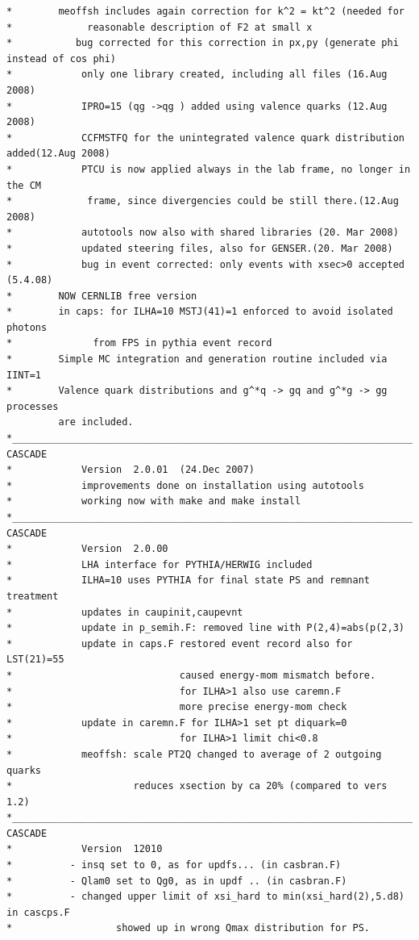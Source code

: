 \documentclass[11pt]{article} \usepackage{mystyle-new}
\begin{document}
\begin{tiny}
\begin{verbatim}
*		 meoffsh includes again correction for k^2 = kt^2 (needed for
*             reasonable description of F2 at small x
*	        bug corrected for this correction in px,py (generate phi instead of cos phi)
*            only one library created, including all files (16.Aug 2008)
*            IPRO=15 (qg ->qg ) added using valence quarks (12.Aug 2008)
*            CCFMSTFQ for the unintegrated valence quark distribution added(12.Aug 2008)
*            PTCU is now applied always in the lab frame, no longer in the CM
*             frame, since divergencies could be still there.(12.Aug 2008)
*            autotools now also with shared libraries (20. Mar 2008)
*            updated steering files, also for GENSER.(20. Mar 2008)
*            bug in event corrected: only events with xsec>0 accepted (5.4.08)
*		 NOW CERNLIB free version
* 		 in caps: for ILHA=10 MSTJ(41)=1 enforced to avoid isolated photons
*              from FPS in pythia event record
*		 Simple MC integration and generation routine included via IINT=1
*		 Valence quark distributions and g^*q -> gq and g^*g -> gg processes
		 are included.
*________________________________________________________________________
CASCADE 
*            Version  2.0.01  (24.Dec 2007)
*            improvements done on installation using autotools
*            working now with make and make install
*________________________________________________________________________
CASCADE 
*            Version  2.0.00 
*            LHA interface for PYTHIA/HERWIG included
*            ILHA=10 uses PYTHIA for final state PS and remnant treatment
*            updates in caupinit,caupevnt
*            update in p_semih.F: removed line with P(2,4)=abs(p(2,3)
*            update in caps.F restored event record also for LST(21)=55
*                             caused energy-mom mismatch before.
*                             for ILHA>1 also use caremn.F
*                             more precise energy-mom check
*            update in caremn.F for ILHA>1 set pt diquark=0
*                             for ILHA>1 limit chi<0.8
*            meoffsh: scale PT2Q changed to average of 2 outgoing quarks
*                     reduces xsection by ca 20% (compared to vers 1.2)
*________________________________________________________________________
CASCADE 
*            Version  12010
*          - insq set to 0, as for updfs... (in casbran.F)
*          - Qlam0 set to Qg0, as in updf .. (in casbran.F) 
*          - changed upper limit of xsi_hard to min(xsi_hard(2),5.d8) in cascps.F 
*                  showed up in wrong Qmax distribution for PS.

\end{verbatim}
\end{tiny}
\end{document}
